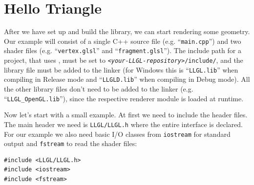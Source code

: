 \documentclass{article}
\begin{document}







\newpage

\section*{Hello Triangle}

After we have set up and build the library, we can start rendering some geometry.
Our example will consist of a single C++ source file (e.g. ``\texttt{main.cpp}'') and two shader files
(e.g. ``\texttt{vertex.glsl}'' and ``\texttt{fragment.glsl}'').
The include path for a project, that uses \LLGL, must be set to \texttt{\textit{<your-LLGL-repository>}/include/},
and the \LLGL library file must be added to the linker (for Windows this is ``\texttt{LLGL.lib}''
when compiling in Release mode and ``\texttt{LLGLD.lib}'' when compiling in Debug mode).
All the other library files don't need to be added to the linker (e.g. ``\texttt{LLGL\_OpenGL.lib}''),
since the respective renderer module is loaded at runtime.

Now let's start with a small example. At first we need to include the header files.
The main header we need is \texttt{LLGL/LLGL.h} where the entire \LLGL interface is declared.
For our example we also need basic I/O classes from \texttt{iostream} for standard output and \texttt{fstream}
to read the shader files:
\begin{lstlisting}
#include <LLGL/LLGL.h>
#include <iostream>
#include <fstream>
\end{lstlisting}
\end{document}
